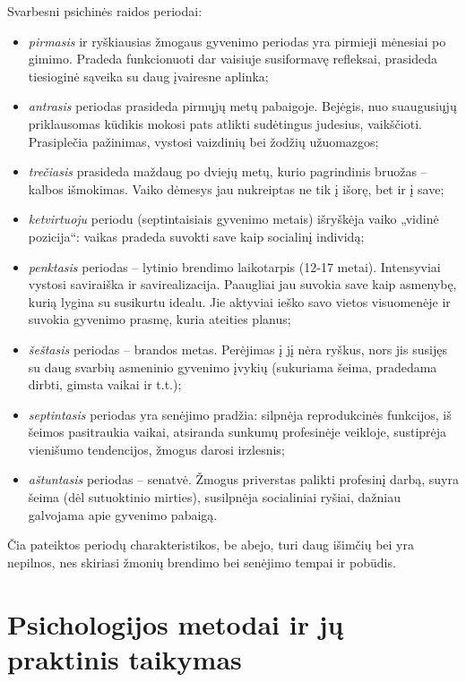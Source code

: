 Svarbesni psichinės raidos periodai:
\begin{itemize}
  \item \emph{pirmasis} ir ryškiausias žmogaus gyvenimo periodas yra 
    pirmieji mėnesiai po gimimo. Pradeda funkcionuoti dar vaisiuje 
    susiformavę refleksai, prasideda tiesioginė sąveika su daug įvairesne 
    aplinka;
  \item \emph{antrasis} periodas prasideda pirmųjų metų pabaigoje. 
    Bejėgis, nuo suaugusiųjų priklausomas kūdikis mokosi pats atlikti 
    sudėtingus judesius, vaikščioti. Prasiplečia pažinimas, vystosi 
    vaizdinių bei žodžių užuomazgos;
  \item \emph{trečiasis} prasideda maždaug po dviejų metų, kurio 
    pagrindinis bruožas – kalbos išmokimas. Vaiko dėmesys jau nukreiptas ne 
    tik į išorę, bet ir į save;
  \item \emph{ketvirtuoju} periodu (septintaisiais gyvenimo metais) 
    išryškėja vaiko „vidinė pozicija“: vaikas pradeda suvokti save kaip 
    socialinį individą;
  \item \emph{penktasis} periodas – lytinio brendimo laikotarpis 
    (12-17 metai). Intensyviai vystosi saviraiška ir 
    savirealizacija. Paaugliai jau suvokia save kaip asmenybę, kurią lygina 
    su susikurtu idealu. Jie aktyviai ieško savo vietos visuomenėje ir 
    suvokia gyvenimo prasmę, kuria ateities planus;
  \item \emph{šeštasis} periodas – brandos metas. Perėjimas į jį nėra 
    ryškus, nors jis susijęs su daug svarbių asmeninio gyvenimo įvykių 
    (sukuriama šeima, pradedama dirbti, gimsta vaikai ir t.t.);
  \item \emph{septintasis} periodas yra senėjimo pradžia: silpnėja 
    reprodukcinės funkcijos, iš šeimos pasitraukia vaikai, atsiranda 
    sunkumų profesinėje veikloje, sustiprėja vienišumo tendencijos, žmogus 
    darosi irzlesnis;
  \item \emph{aštuntasis} periodas – senatvė. Žmogus priverstas palikti 
    profesinį darbą, suyra šeima (dėl sutuoktinio mirties), susilpnėja 
    socialiniai ryšiai, dažniau galvojama apie gyvenimo pabaigą.
\end{itemize}

Čia pateiktos periodų charakteristikos, be abejo, turi daug išimčių bei yra 
nepilnos, nes skiriasi žmonių brendimo bei senėjimo tempai ir pobūdis.

\section{Psichologijos metodai ir jų praktinis taikymas}

